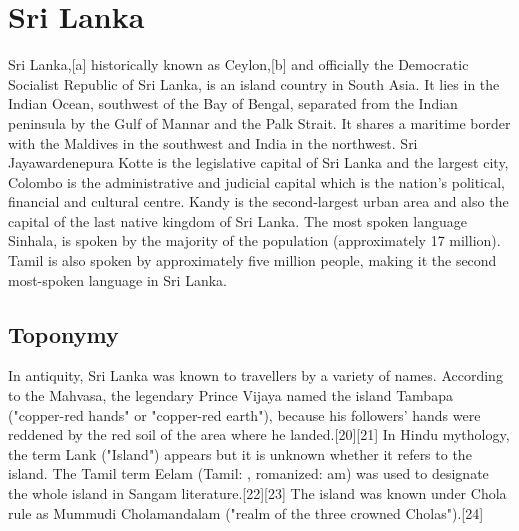 \documentclass{article}
\begin{document}
\section{Sri Lanka}

Sri Lanka,[a] historically known as Ceylon,[b] and officially the Democratic Socialist Republic of Sri Lanka, is an island country in South Asia. It lies in the Indian Ocean, southwest of the Bay of Bengal, separated from the Indian peninsula by the Gulf of Mannar and the Palk Strait. It shares a maritime border with the Maldives in the southwest and India in the northwest. Sri Jayawardenepura Kotte is the legislative capital of Sri Lanka and the largest city, Colombo is the administrative and judicial capital which is the nation's political, financial and cultural centre. Kandy is the second-largest urban area and also the capital of the last native kingdom of Sri Lanka. The most spoken language Sinhala, is spoken by the majority of the population (approximately 17 million). Tamil is also spoken by approximately five million people, making it the second most-spoken language in Sri Lanka.

\subsection{Toponymy}

In antiquity, Sri Lanka was known to travellers by a variety of names. According to the Mahvasa, the legendary Prince Vijaya named the island Tambapa ("copper-red hands" or "copper-red earth"), because his followers' hands were reddened by the red soil of the area where he landed.[20][21] In Hindu mythology, the term Lank ("Island") appears but it is unknown whether it refers to the island. The Tamil term Eelam (Tamil: , romanized: am) was used to designate the whole island in Sangam literature.[22][23] The island was known under Chola rule as Mummudi Cholamandalam ("realm of the three crowned Cholas").[24]
\end{document}
